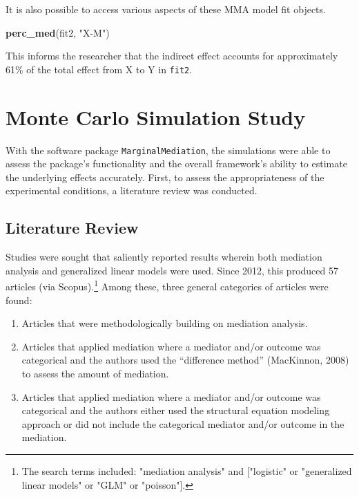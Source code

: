 \documentclass[]{DissertateUSU}
\newenvironment{Shaded}{\begin{snugshade}}{\end{snugshade}}
\newcommand{\KeywordTok}[1]{\textcolor[rgb]{0.13,0.29,0.53}{\textbf{#1}}}
\newcommand{\StringTok}[1]{\textcolor[rgb]{0.31,0.60,0.02}{#1}}
\newcommand{\NormalTok}[1]{#1}
\providecommand{\tightlist}{%
  \setlength{\itemsep}{0pt}\setlength{\parskip}{0pt}}
\let\rmarkdownfootnote\footnote%
\def\footnote{\protect\rmarkdownfootnote}
\begin{document}
\doublespacing

It is also possible to access various aspects of these MMA model fit
objects.

\begin{Shaded}
\begin{Highlighting}[]
\KeywordTok{perc_med}\NormalTok{(fit2, }\StringTok{"X-M"}\NormalTok{)}
\end{Highlighting}
\end{Shaded}

\noindent This informs the researcher that the indirect effect accounts
for approximately 61\% of the total effect from X to Y in \texttt{fit2}.

\section{Monte Carlo Simulation
Study}\label{monte-carlo-simulation-study}

With the software package \texttt{MarginalMediation}, the simulations
were able to assess the package's functionality and the overall
framework's ability to estimate the underlying effects accurately.
First, to assess the appropriateness of the experimental conditions, a
literature review was conducted.

\subsection{Literature Review}\label{literature-review-2}

Studies were sought that saliently reported results wherein both
mediation analysis and generalized linear models were used. Since 2012,
this produced 57 articles (via
Scopus).\footnote{The search terms included: "mediation analysis" and ["logistic" or "generalized linear models" or "GLM" or "poisson"].}
Among these, three general categories of articles were found:

\begin{enumerate}
\def\labelenumi{\arabic{enumi}.}
\tightlist
\item
  Articles that were methodologically building on mediation analysis.
\item
  Articles that applied mediation where a mediator and/or outcome was
  categorical and the authors used the ``difference method'' (MacKinnon,
  2008) to assess the amount of mediation.
\item
  Articles that applied mediation where a mediator and/or outcome was
  categorical and the authors either used the structural equation
  modeling approach or did not include the categorical mediator and/or
  outcome in the mediation.
\end{enumerate}
\end{document}
